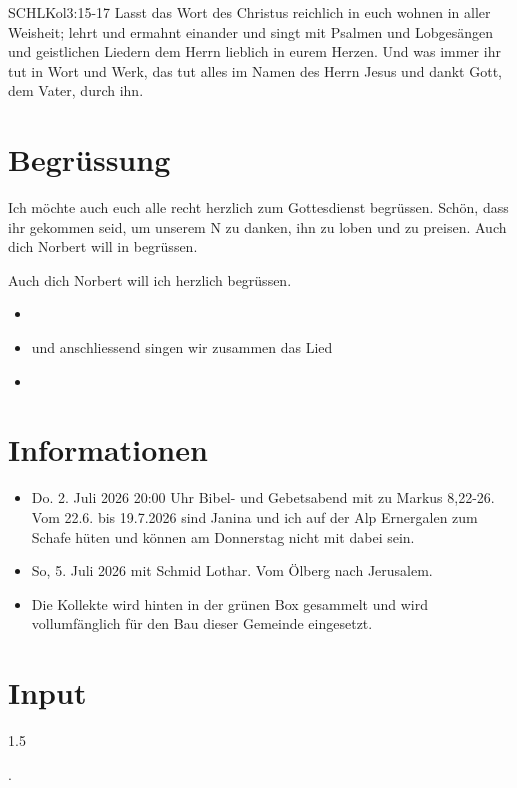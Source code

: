 \documentclass[fontsize=14pt]{mybib}
\author{OTS}
\newcommand{\Name}{Norbert}
\begin{document}
\begin{bibelbox}{SCHL}{Kol}{3:15-17}
    Lasst das Wort des Christus reichlich in euch wohnen in aller Weisheit; lehrt und ermahnt einander und singt mit Psalmen und Lobgesängen und geistlichen Liedern dem Herrn lieblich in eurem Herzen. Und was immer ihr tut in Wort und Werk, das tut alles im Namen des Herrn Jesus und dankt Gott, dem Vater, durch ihn.
\end{bibelbox}
\section{Begrüssung}
Ich möchte auch euch alle recht herzlich zum Gottesdienst begrüssen. Schön, dass ihr gekommen seid, um unserem \herr N zu danken, ihn zu loben und zu preisen. Auch dich Norbert will in begrüssen. 

Auch dich \Name{} will ich herzlich begrüssen. 
\begin{itemize}
    \item[] 
    \item[] und anschliessend singen wir zusammen das Lied
    \item[] 
\end{itemize}
\section{Informationen}
\begin{itemize}
    \item {} Do. 2. Juli 2026 20:00 Uhr Bibel- und Gebetsabend mit zu Markus 8,22-26.\\
    Vom 22.6. bis 19.7.2026 sind Janina und ich auf der Alp Ernergalen zum Schafe hüten und können am Donnerstag nicht mit dabei sein.
    \item {} So, 5. Juli 2026 mit Schmid Lothar. Vom Ölberg nach Jerusalem.
    \item {} Die Kollekte wird hinten in der grünen Box gesammelt und wird vollumfänglich für den Bau dieser Gemeinde eingesetzt.
\end{itemize}
\section{Input}
\begin{spacing}{1.5}
      
    .
\end{spacing}
\end{document}

